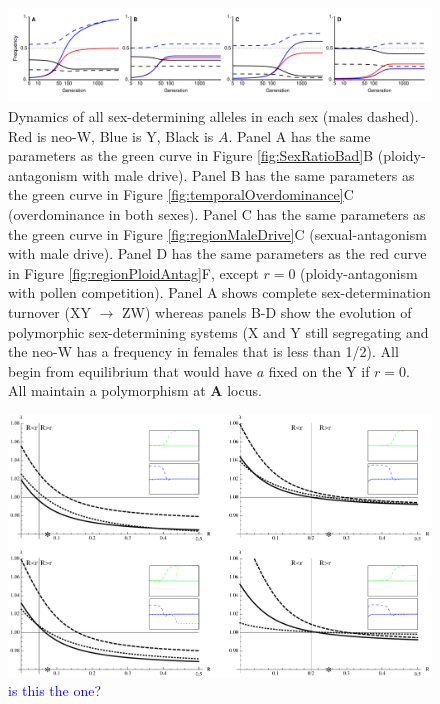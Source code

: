 \documentclass[12pt]{article}
\begin{document}
\begin{landscape}
\begin{figure}[!h]
\centering
\centerline{
\includegraphics[width=\linewidth]{Freq_plot_combined_PloidAntag_Matt}
}
\caption{
Dynamics of all sex-determining alleles in each sex (males dashed).
Red is neo-W, Blue is Y, Black is $A$.
Panel A has the same parameters as the green curve in Figure \ref{fig:SexRatioBad}B (ploidy-antagonism with male drive).
Panel B has the same parameters as the green curve in Figure \ref{fig:temporalOverdominance}C (overdominance in both sexes).
Panel C has the same parameters as the green curve in Figure \ref{fig:regionMaleDrive}C (sexual-antagonism with male drive).
Panel D has the same parameters as the red curve in Figure \ref{fig:regionPloidAntag}F, except $r=0$ (ploidy-antagonism with pollen competition).
Panel A shows complete sex-determination turnover (XY $\rightarrow$ ZW) whereas panels B-D show the evolution of polymorphic sex-determining systems (X and Y still segregating and the neo-W has a frequency in females that is less than 1/2).
All begin from equilibrium that would have $a$ fixed on the Y if $r=0$.
All maintain a polymorphism at $\mathbf{A}$ locus.
}
\label{fig:freqAll}
\end{figure}
\end{landscape}

\begin{figure}[!h]
\centering
\centerline{
\includegraphics[width=\linewidth]{Sallys_R_plot.pdf}
}
\caption{
\textcolor{blue}{is this the one?}
}
\label{fig:lambda_R}
\end{figure}
\end{document}
